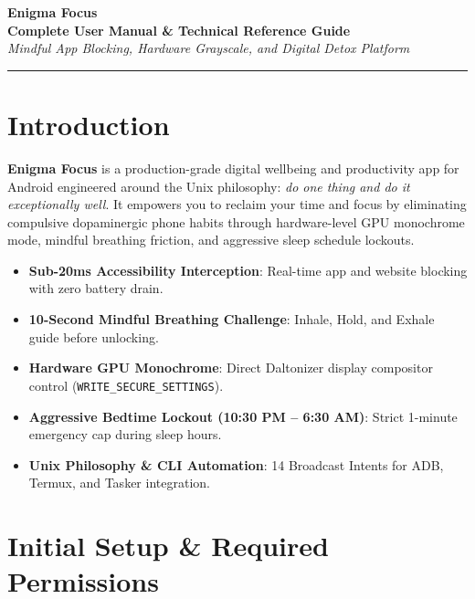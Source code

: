 \documentclass[11pt,a4paper]{article}
\begin{document}
\begin{center}
    {\Huge \textbf{\color{primaryDark}Enigma Focus}}\\[0.3cm]
    {\Large \textbf{\color{accentGreen}Complete User Manual \& Technical Reference Guide}}\\[0.2cm]
    \textit{Mindful App Blocking, Hardware Grayscale, and Digital Detox Platform}\\[0.4cm]
    \rule{\linewidth}{1.5pt}
\end{center}

\vspace{0.3cm}

\section{Introduction}
\textbf{Enigma Focus} is a production-grade digital wellbeing and productivity app for Android engineered around the Unix philosophy: \textit{do one thing and do it exceptionally well}. It empowers you to reclaim your time and focus by eliminating compulsive dopaminergic phone habits through hardware-level GPU monochrome mode, mindful breathing friction, and aggressive sleep schedule lockouts.

\begin{tcolorbox}[colback=codeBg,colframe=accentGreen,title=\textbf{Key Feature Highlights}]
\begin{itemize}[noitemsep]
    \item \textbf{Sub-20ms Accessibility Interception}: Real-time app and website blocking with zero battery drain.
    \item \textbf{10-Second Mindful Breathing Challenge}: Inhale, Hold, and Exhale guide before unlocking.
    \item \textbf{Hardware GPU Monochrome}: Direct Daltonizer display compositor control (\texttt{WRITE\_SECURE\_SETTINGS}).
    \item \textbf{Aggressive Bedtime Lockout (10:30 PM -- 6:30 AM)}: Strict 1-minute emergency cap during sleep hours.
    \item \textbf{Unix Philosophy \& CLI Automation}: 14 Broadcast Intents for ADB, Termux, and Tasker integration.
\end{itemize}
\end{tcolorbox}

\section{Initial Setup \& Required Permissions}
\end{document}
